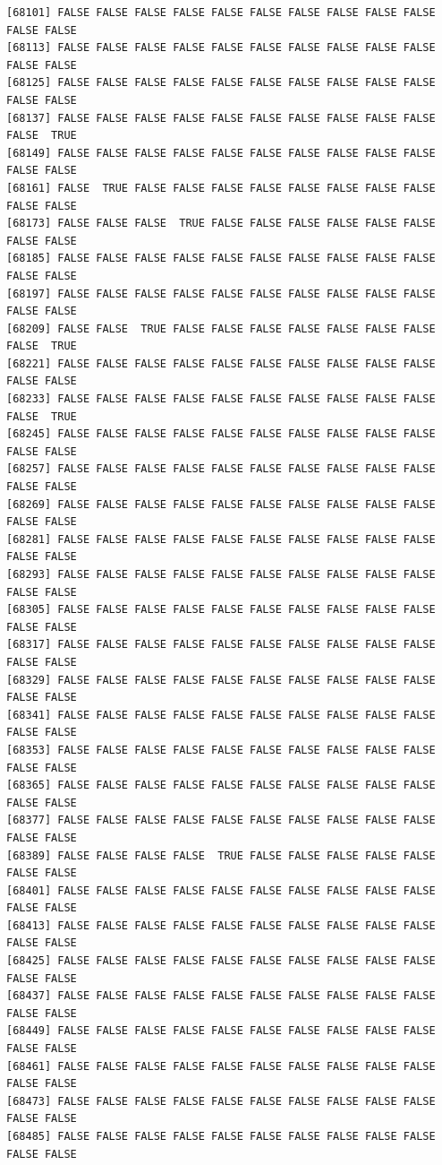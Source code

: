 \documentclass[
  a4paper,
  DIV=11,
  numbers=noendperiod]{scrartcl}
\begin{document}
\begin{verbatim}
[68101] FALSE FALSE FALSE FALSE FALSE FALSE FALSE FALSE FALSE FALSE FALSE FALSE
[68113] FALSE FALSE FALSE FALSE FALSE FALSE FALSE FALSE FALSE FALSE FALSE FALSE
[68125] FALSE FALSE FALSE FALSE FALSE FALSE FALSE FALSE FALSE FALSE FALSE FALSE
[68137] FALSE FALSE FALSE FALSE FALSE FALSE FALSE FALSE FALSE FALSE FALSE  TRUE
[68149] FALSE FALSE FALSE FALSE FALSE FALSE FALSE FALSE FALSE FALSE FALSE FALSE
[68161] FALSE  TRUE FALSE FALSE FALSE FALSE FALSE FALSE FALSE FALSE FALSE FALSE
[68173] FALSE FALSE FALSE  TRUE FALSE FALSE FALSE FALSE FALSE FALSE FALSE FALSE
[68185] FALSE FALSE FALSE FALSE FALSE FALSE FALSE FALSE FALSE FALSE FALSE FALSE
[68197] FALSE FALSE FALSE FALSE FALSE FALSE FALSE FALSE FALSE FALSE FALSE FALSE
[68209] FALSE FALSE  TRUE FALSE FALSE FALSE FALSE FALSE FALSE FALSE FALSE  TRUE
[68221] FALSE FALSE FALSE FALSE FALSE FALSE FALSE FALSE FALSE FALSE FALSE FALSE
[68233] FALSE FALSE FALSE FALSE FALSE FALSE FALSE FALSE FALSE FALSE FALSE  TRUE
[68245] FALSE FALSE FALSE FALSE FALSE FALSE FALSE FALSE FALSE FALSE FALSE FALSE
[68257] FALSE FALSE FALSE FALSE FALSE FALSE FALSE FALSE FALSE FALSE FALSE FALSE
[68269] FALSE FALSE FALSE FALSE FALSE FALSE FALSE FALSE FALSE FALSE FALSE FALSE
[68281] FALSE FALSE FALSE FALSE FALSE FALSE FALSE FALSE FALSE FALSE FALSE FALSE
[68293] FALSE FALSE FALSE FALSE FALSE FALSE FALSE FALSE FALSE FALSE FALSE FALSE
[68305] FALSE FALSE FALSE FALSE FALSE FALSE FALSE FALSE FALSE FALSE FALSE FALSE
[68317] FALSE FALSE FALSE FALSE FALSE FALSE FALSE FALSE FALSE FALSE FALSE FALSE
[68329] FALSE FALSE FALSE FALSE FALSE FALSE FALSE FALSE FALSE FALSE FALSE FALSE
[68341] FALSE FALSE FALSE FALSE FALSE FALSE FALSE FALSE FALSE FALSE FALSE FALSE
[68353] FALSE FALSE FALSE FALSE FALSE FALSE FALSE FALSE FALSE FALSE FALSE FALSE
[68365] FALSE FALSE FALSE FALSE FALSE FALSE FALSE FALSE FALSE FALSE FALSE FALSE
[68377] FALSE FALSE FALSE FALSE FALSE FALSE FALSE FALSE FALSE FALSE FALSE FALSE
[68389] FALSE FALSE FALSE FALSE  TRUE FALSE FALSE FALSE FALSE FALSE FALSE FALSE
[68401] FALSE FALSE FALSE FALSE FALSE FALSE FALSE FALSE FALSE FALSE FALSE FALSE
[68413] FALSE FALSE FALSE FALSE FALSE FALSE FALSE FALSE FALSE FALSE FALSE FALSE
[68425] FALSE FALSE FALSE FALSE FALSE FALSE FALSE FALSE FALSE FALSE FALSE FALSE
[68437] FALSE FALSE FALSE FALSE FALSE FALSE FALSE FALSE FALSE FALSE FALSE FALSE
[68449] FALSE FALSE FALSE FALSE FALSE FALSE FALSE FALSE FALSE FALSE FALSE FALSE
[68461] FALSE FALSE FALSE FALSE FALSE FALSE FALSE FALSE FALSE FALSE FALSE FALSE
[68473] FALSE FALSE FALSE FALSE FALSE FALSE FALSE FALSE FALSE FALSE FALSE FALSE
[68485] FALSE FALSE FALSE FALSE FALSE FALSE FALSE FALSE FALSE FALSE FALSE FALSE

\end{verbatim}
\end{document}
